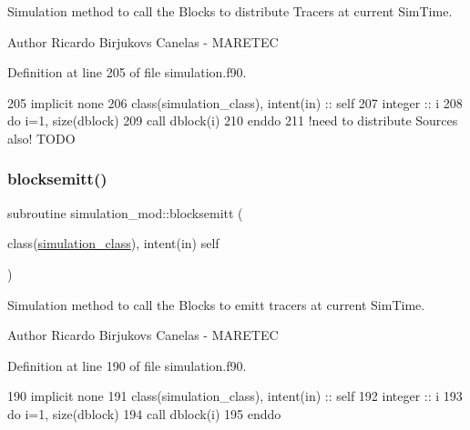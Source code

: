 Simulation method to call the Blocks to distribute Tracers at current Sim\+Time. 

\begin{DoxyAuthor}{Author}
Ricardo Birjukovs Canelas -\/ M\+A\+R\+E\+T\+EC 
\end{DoxyAuthor}


Definition at line 205 of file simulation.\+f90.


\begin{DoxyCode}
205         \textcolor{keywordtype}{implicit none}
206         \textcolor{keywordtype}{class}(simulation\_class), \textcolor{keywordtype}{intent(in)} :: self        
207         \textcolor{keywordtype}{integer} :: i
208         \textcolor{keywordflow}{do} i=1, \textcolor{keyword}{size}(dblock)
209             \textcolor{keyword}{call }dblock(i)%
210 \textcolor{keywordflow}{        enddo}
211         \textcolor{comment}{!need to distribute Sources also! TODO}
\end{DoxyCode}
\mbox{\label{namespacesimulation__mod_a13aa0745f4601e3f418143dab2f18276}} 
\subsubsection{\texorpdfstring{blocksemitt()}{blocksemitt()}}
{\footnotesize\ttfamily subroutine simulation\+\_\+mod\+::blocksemitt (\begin{DoxyParamCaption}\item[{class(\mbox{\hyperlink{structsimulation__mod_1_1simulation__class}{simulation\+\_\+class}}), intent(in)}]{self }\end{DoxyParamCaption})\hspace{0.3cm}{\ttfamily [private]}}



Simulation method to call the Blocks to emitt tracers at current Sim\+Time. 

\begin{DoxyAuthor}{Author}
Ricardo Birjukovs Canelas -\/ M\+A\+R\+E\+T\+EC 
\end{DoxyAuthor}


Definition at line 190 of file simulation.\+f90.


\begin{DoxyCode}
190         \textcolor{keywordtype}{implicit none}
191         \textcolor{keywordtype}{class}(simulation\_class), \textcolor{keywordtype}{intent(in)} :: self
192         \textcolor{keywordtype}{integer} :: i
193         \textcolor{keywordflow}{do} i=1, \textcolor{keyword}{size}(dblock)
194             \textcolor{keyword}{call }dblock(i)%
195 \textcolor{keywordflow}{        enddo}        
\end{DoxyCode}
\mbox{\label{namespacesimulation__mod_a624d5b402a8d359219839841862ab307}} 
